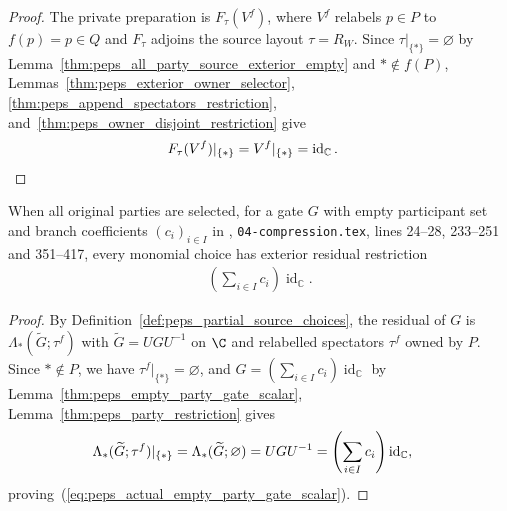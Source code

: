 \begin{proof}\leanok
    The private preparation is $F_\tau(V^f)$, where $V^f$ relabels $p\in P$ to
    $f(p)=p\in Q$ and $F_\tau$ adjoins the source layout $\tau=R_W$. Since
    $\tau|_{\{*\}}=\varnothing$ by
    Lemma~\ref{thm:peps_all_party_source_exterior_empty} and $*\notin f(P)$,
    Lemmas~\ref{thm:peps_exterior_owner_selector},
    \ref{thm:peps_append_spectators_restriction},
    and~\ref{thm:peps_owner_disjoint_restriction} give
    \begin{align}
        F_\tau(V^f)|_{\{*\}}
         & =V^f|_{\{*\}}=\operatorname{id}_{\mathbb C}.\notag
    \end{align}
\end{proof}


\begin{lemma}
    \label{thm:peps_actual_empty_party_gate_scalar}
    \leanok
    When all original parties are selected, for a gate $G$ with empty
    participant set and branch coefficients $(c_i)_{i\in I}$ in
    \cite[proof of Theorem~5.2]{OpenAI2026PolynomialPEPS},
    \texttt{04-compression.tex}, lines 24--28, 233--251 and 351--417,
    every monomial choice has exterior residual restriction
    \begin{align}
        \left(\sum_{i\in I}c_i\right)\operatorname{id}_{\mathbb C}.
        \label{eq:peps_actual_empty_party_gate_scalar}
    \end{align}
\end{lemma}

\begin{proof}\leanok
    By Definition~\ref{def:peps_partial_source_choices}, the residual of $G$ is
    $\Lambda_*(\widetilde G;\tau^f)$ with $\widetilde G=UGU^{-1}$ on $\C$ and
    relabelled spectators $\tau^f$ owned by $P$. Since $*\notin P$, we have
    $\tau^f|_{\{*\}}=\varnothing$,
    and $G=(\sum_{i\in I}c_i)\operatorname{id}_{\mathbb C}$ by
    Lemma~\ref{thm:peps_empty_party_gate_scalar},
    Lemma~\ref{thm:peps_party_restriction} gives
    \begin{align}
        \Lambda_*(\widetilde G;\tau^f)|_{\{*\}}
         & =\Lambda_*(\widetilde G;\varnothing)
        =UGU^{-1}
        =\left(\sum_{i\in I}c_i\right)\operatorname{id}_{\mathbb C},\notag
    \end{align}
    proving~(\ref{eq:peps_actual_empty_party_gate_scalar}).
\end{proof}


